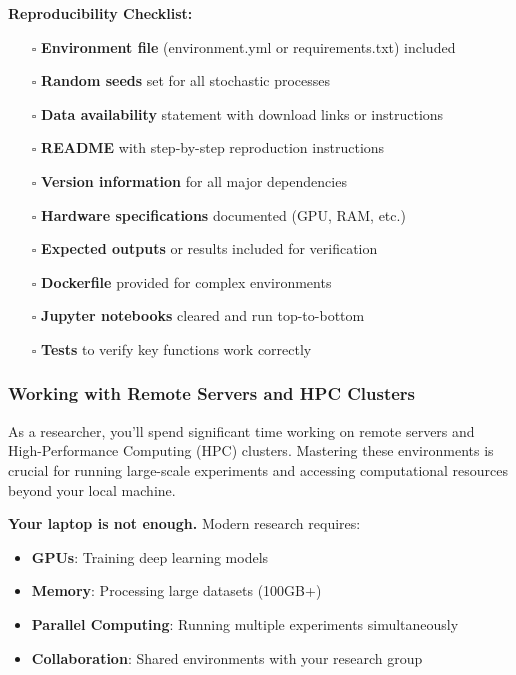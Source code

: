 \documentclass[11pt,a4paper]{article}
\begin{document}
\textbf{Reproducibility Checklist:}

\begin{tcolorbox}[colback=green!5,colframe=green!50,title={Before Publishing Your Research}]
\begin{itemize}
    \item[$\square$] \textbf{Environment file} (environment.yml or requirements.txt) included
    \item[$\square$] \textbf{Random seeds} set for all stochastic processes
    \item[$\square$] \textbf{Data availability} statement with download links or instructions
    \item[$\square$] \textbf{README} with step-by-step reproduction instructions
    \item[$\square$] \textbf{Version information} for all major dependencies
    \item[$\square$] \textbf{Hardware specifications} documented (GPU, RAM, etc.)
    \item[$\square$] \textbf{Expected outputs} or results included for verification
    \item[$\square$] \textbf{Dockerfile} provided for complex environments
    \item[$\square$] \textbf{Jupyter notebooks} cleared and run top-to-bottom
    \item[$\square$] \textbf{Tests} to verify key functions work correctly
\end{itemize}
\end{tcolorbox}

\subsubsection{Working with Remote Servers and HPC Clusters}

As a researcher, you'll spend significant time working on remote servers and High-Performance Computing (HPC) clusters. Mastering these environments is crucial for running large-scale experiments and accessing computational resources beyond your local machine.

\begin{tcolorbox}[colback=blue!5,colframe=blue!40,title={Why Remote Servers Matter}]
\textbf{Your laptop is not enough.} Modern research requires:
\begin{itemize}
    \item \textbf{GPUs}: Training deep learning models
    \item \textbf{Memory}: Processing large datasets (100GB+)
    \item \textbf{Parallel Computing}: Running multiple experiments simultaneously
    \item \textbf{Collaboration}: Shared environments with your research group
\end{itemize}
\end{tcolorbox}
\end{document}
